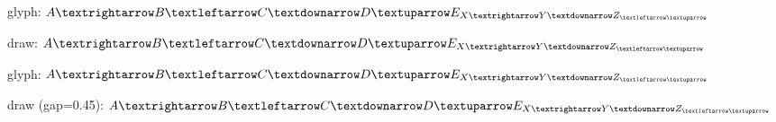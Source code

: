 \documentclass{article}
\newcommand\row{%
  $A\folrightarrow B\folleftarrow C\foldownarrow D\foluparrow E
   _{X\folrightarrow Y\foldownarrow Z_{\folleftarrow\foluparrow}}$}
\begin{document}
glyph: \row\par
{draw: \row\par}
{\large glyph: \row\par}
{draw (gap=0.45): \row\par}
\end{document}
